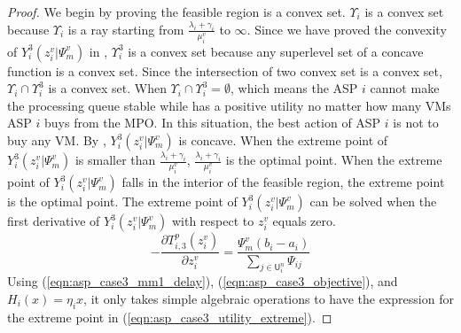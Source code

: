 \documentclass[10pt,journal, compsoc]{IEEEtran}
\begin{document}
\begin{proof}
We begin by proving the feasible region is a convex set. $\Upsilon_i$ is a convex set because $\Upsilon_i$ is a ray starting from $\frac{\lambda_i+\gamma_i}{\mu_i^v}$ to $\infty$. Since we have proved the convexity of $Y_i^3(z_i^v|\Psi_m^v)$ in , $\Upsilon_i^3$ is a convex set because any superlevel set of a concave function is a convex set. Since the intersection of two convex set is a convex set, $\Upsilon_i \cap \Upsilon_i^3$ is a convex set. When $\Upsilon_i \cap \Upsilon_i^3 = \emptyset$, which means the ASP $i$ cannot make the processing queue stable while has a positive utility no matter how many VMs ASP $i$ buys from the MPO. In this situation, the best action of ASP $i$ is not to buy any VM. By , $Y_i^3(z_i^v|\Psi_m^v)$ is concave. When the extreme point of $Y_i^3(z_i^v|\Psi_m^v)$ is smaller than $\frac{\lambda_i+\gamma_i}{\mu_i^v}$, $\frac{\lambda_i+\gamma_i}{\mu_i^v}$ is the optimal point. When the extreme point of $Y_i^3(z_i^v|\Psi_m^v)$ falls in the interior of the feasible region, the extreme point is the optimal point. The extreme point of $Y_i^3(z_i^v|\Psi_m^v)$ can be solved when the first derivative of $Y_i^3(z_i^v|\Psi_m^v)$ with respect to $z_i^v$ equals zero.
\begin{equation} \label{eqn:asp_case3_utility_first_deriv}
-\frac{\partial T_{i,3}^p(z_i^v)}{\partial z_i^v} = \frac{\Psi_m^v (b_i - a_i)}{\sum_{j \in \mathsf{U}_i^n} \Psi_{ij}}
\end{equation}
Using (\ref{eqn:asp_case3_mm1_delay}), (\ref{eqn:asp_case3_objective}), and $H_i(x)=\eta_i x $, it only takes simple algebraic operations to have the expression for the extreme point in (\ref{eqn:asp_case3_utility_extreme}). \qedhere
\end{proof}
\end{document}
